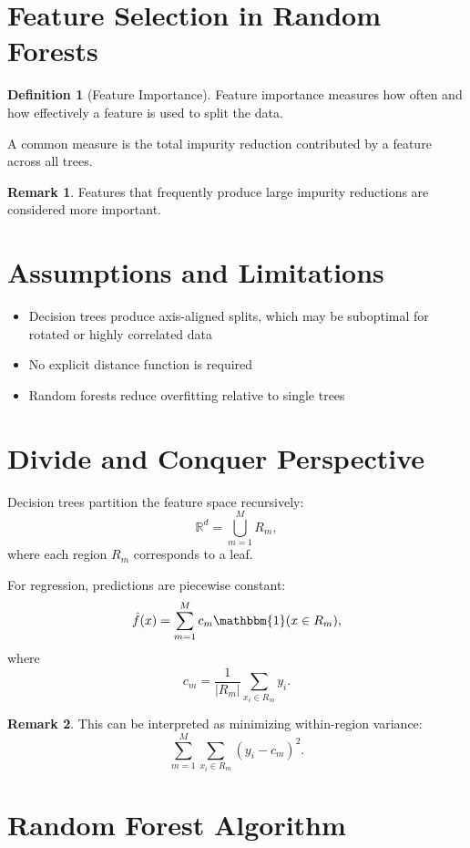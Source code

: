 \documentclass[12pt,oneside]{book}
\numberwithin{equation}{section}
\theoremstyle{definition}
\newtheorem{definition}{Definition}[section]
\newtheorem{remark}{Remark}[section]
\theoremstyle{plain}
\theoremstyle{remark}
\newcommand{\R}{\mathbb{R}}
\newcommand{\ind}{\mathbbm{1}}
\begin{document}
\section{Feature Selection in Random Forests}

\begin{definition}[Feature Importance]
Feature importance measures how often and how effectively a feature is used to split the data.
\end{definition}

A common measure is the total impurity reduction contributed by a feature across all trees.

\begin{remark}
Features that frequently produce large impurity reductions are considered more important.
\end{remark}

\section{Assumptions and Limitations}

\begin{itemize}
    \item Decision trees produce axis-aligned splits, which may be suboptimal for rotated or highly correlated data
    \item No explicit distance function is required
    \item Random forests reduce overfitting relative to single trees
\end{itemize}

\section{Divide and Conquer Perspective}

Decision trees partition the feature space recursively:
\[
\R^d = \bigcup_{m=1}^M R_m,
\]
where each region $R_m$ corresponds to a leaf.

For regression, predictions are piecewise constant:
\[
\hat{f}(x)
=
\sum_{m=1}^M c_m \ind(x \in R_m),
\]
where
\[
c_m
=
\frac{1}{|R_m|}
\sum_{x_i \in R_m} y_i.
\]

\begin{remark}
This can be interpreted as minimizing within-region variance:
\[
\sum_{m=1}^M \sum_{x_i \in R_m} (y_i - c_m)^2.
\]
\end{remark}

\section{Random Forest Algorithm}
\end{document}
